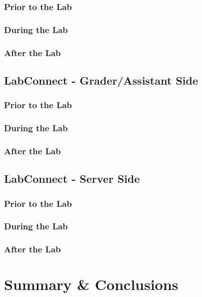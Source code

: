 \documentclass[a4paper, 12pt]{article}
\begin{document}
    \subsubsection{Prior to the Lab}
    \subsubsection{During the Lab}
    \subsubsection{After the Lab}
    
    \subsection{LabConnect - Grader/Assistant Side}

    \subsubsection{Prior to the Lab}
    \subsubsection{During the Lab}
    \subsubsection{After the Lab}
    
    \subsection{LabConnect - Server Side}

    \subsubsection{Prior to the Lab}
    \subsubsection{During the Lab}
    \subsubsection{After the Lab}
    
    \section{Summary \& Conclusions}
    
    \printbibliography
    
    
        
\end{document}
